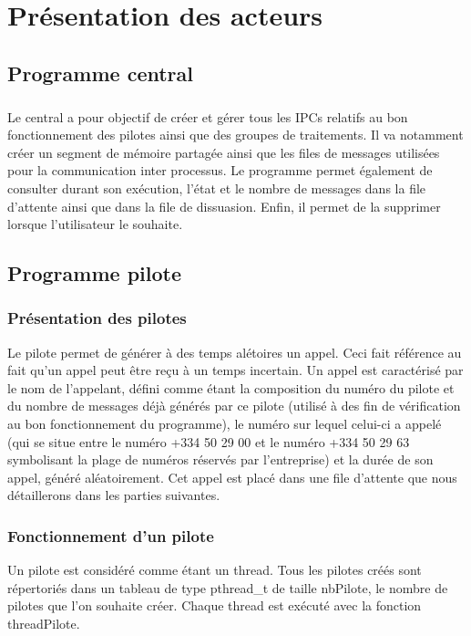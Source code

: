 \documentclass{report}
\begin{document}
\chapter{Présentation des acteurs}
	\section{Programme central}
		\paragraph{}
			Le central a pour objectif de créer et gérer tous les IPCs relatifs au bon fonctionnement des pilotes ainsi que des groupes de traitements. Il va notamment créer un segment de mémoire partagée ainsi que les files de messages utilisées pour la communication inter processus. Le programme permet également de consulter durant son exécution, l'état et le nombre de messages dans la file d'attente ainsi que dans la file de dissuasion. Enfin, il permet de la supprimer lorsque l'utilisateur le souhaite.

	\section{Programme pilote}
		\subsection{Présentation des pilotes}
			Le pilote permet de générer à des temps alétoires un appel. Ceci fait référence au fait qu'un appel peut être reçu à un temps incertain. Un appel est caractérisé par le nom de l'appelant, défini comme étant la composition du numéro du pilote et du nombre de messages déjà générés par ce pilote (utilisé à des fin de vérification au bon fonctionnement du programme), le numéro sur lequel celui-ci a appelé (qui se situe entre le numéro +334 50 29 00 et le numéro +334 50 29 63 symbolisant la plage de numéros réservés par l'entreprise) et la durée de son appel, généré aléatoirement. Cet appel est placé dans une file d'attente que nous détaillerons dans les parties suivantes.
		\subsection{Fonctionnement d'un pilote}
			Un pilote est considéré comme étant un thread. Tous les pilotes créés sont répertoriés dans un tableau de type pthread\_t de taille nbPilote, le nombre de pilotes que l'on souhaite créer. Chaque thread est exécuté avec la fonction threadPilote.
\end{document}
